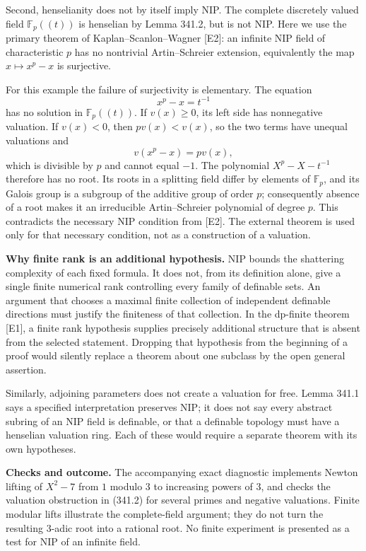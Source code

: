 \documentclass[11pt]{article}
\begin{document}
Second, henselianity does not by itself imply NIP. The complete discretely valued field $\mathbb F_p((t))$ is henselian by Lemma 341.2, but is not NIP. Here we use the primary theorem of Kaplan--Scanlon--Wagner [E2]: an infinite NIP field of characteristic $p$ has no nontrivial Artin--Schreier extension, equivalently the map $x\mapsto x^p-x$ is surjective.

For this example the failure of surjectivity is elementary. The equation
\[
 x^p-x=t^{-1}
 \tag{341.2}
\]
has no solution in $\mathbb F_p((t))$. If $v(x)\geq0$, its left side has nonnegative valuation. If $v(x)<0$, then $pv(x)<v(x)$, so the two terms have unequal valuations and
\[
 v(x^p-x)=pv(x),
\]
which is divisible by $p$ and cannot equal $-1$. The polynomial $X^p-X-t^{-1}$ therefore has no root. Its roots in a splitting field differ by elements of $\mathbb F_p$, and its Galois group is a subgroup of the additive group of order $p$; consequently absence of a root makes it an irreducible Artin--Schreier polynomial of degree $p$. This contradicts the necessary NIP condition from [E2]. The external theorem is used only for that necessary condition, not as a construction of a valuation.

\textbf{Why finite rank is an additional hypothesis.} NIP bounds the shattering complexity of each fixed formula. It does not, from its definition alone, give a single finite numerical rank controlling every family of definable sets. An argument that chooses a maximal finite collection of independent definable directions must justify the finiteness of that collection. In the dp-finite theorem [E1], a finite rank hypothesis supplies precisely additional structure that is absent from the selected statement. Dropping that hypothesis from the beginning of a proof would silently replace a theorem about one subclass by the open general assertion.

Similarly, adjoining parameters does not create a valuation for free. Lemma 341.1 says a specified interpretation preserves NIP; it does not say every abstract subring of an NIP field is definable, or that a definable topology must have a henselian valuation ring. Each of these would require a separate theorem with its own hypotheses.

\textbf{Checks and outcome.} The accompanying exact diagnostic implements Newton lifting of $X^2-7$ from $1$ modulo $3$ to increasing powers of $3$, and checks the valuation obstruction in (341.2) for several primes and negative valuations. Finite modular lifts illustrate the complete-field argument; they do not turn the resulting $3$-adic root into a rational root. No finite experiment is presented as a test for NIP of an infinite field.
\end{document}
